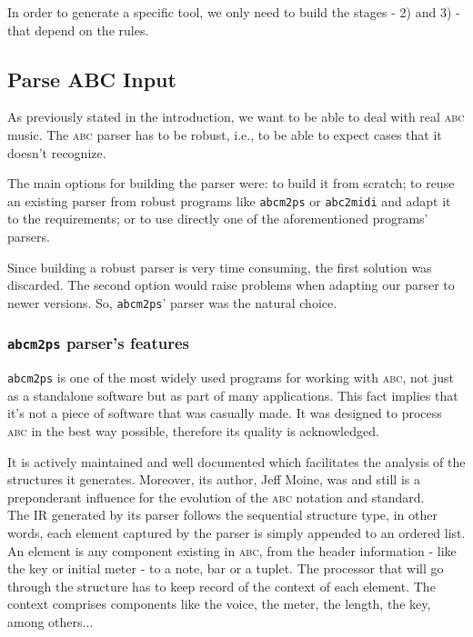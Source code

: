 \documentclass[a4paper,UKenglish]{oasics}
\newcommand{\abc}{\textsc{abc}}
\newcommand{\abcdt}{\textsc{abc::dt}}
\newcommand{\abcmtops}{\texttt{abcm2ps}}
\newcommand{\abctomidi}{\texttt{abc2midi}}
\begin{document}
In order to generate a specific tool, we only need to build the stages - 2) and 3) - that depend on
the rules.


\subsection{Parse ABC Input} 

    As previously stated in the introduction, we want to be able to deal with real \abc{} music.
    The \abc{} parser has to be robust, i.e., to be able to expect cases that it doesn't recognize.


    The main options for building the parser were: to build it from scratch; to reuse an existing
    parser from robust programs like \abcmtops{} or \abctomidi{} and adapt it to the requirements;
    or to use directly one of the aforementioned programs' parsers.

    Since building a robust parser is very time consuming, the first solution was discarded. The
    second option would raise problems when adapting our parser to newer versions. So, \abcmtops'
    parser was the natural choice.

\subsubsection{\abcmtops{} parser's features} 

    \abcmtops{} is one of the most widely used programs for working with \abc, not just as a
    standalone software but as part of many applications. This fact implies that it's not a piece of
    software that was casually made. It was designed to process \abc{} in the best way possible,
    therefore its quality is acknowledged.

    It is actively maintained and well documented which facilitates the analysis of the structures
    it generates. Moreover, its author, Jeff Moine, was and still is a preponderant influence for
    the evolution of the \abc{} notation and standard.\\

    The IR generated by its parser follows the sequential structure type, in other words, each
    element captured by the parser is simply appended to an ordered list. An element is any
    component existing in \abc{}, from the header information - like the key or initial meter - to a
    note, bar or a tuplet. The processor that will go through the structure has to keep record of
    the context of each element. The context comprises components like the voice, the meter, the
    length, the key, among others...\\
\end{document}
